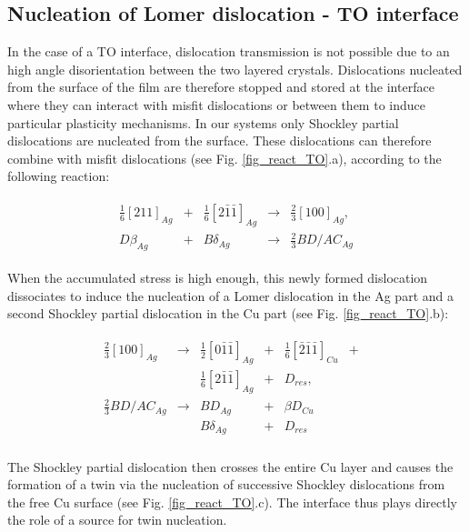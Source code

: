 \documentclass[final,3p,times,twocolumn]{elsarticle}
\begin{document}
	\subsection{Nucleation of Lomer dislocation - TO interface}
	\label{subsubpart_lomer}
	
In the case of a TO interface, dislocation transmission is not possible due to an high angle disorientation between the two layered crystals. Dislocations nucleated from the surface of the film are therefore stopped and stored at the interface where they can interact with misfit dislocations or between them to induce particular plasticity mechanisms. In our systems only Shockley partial dislocations are nucleated from the surface. These dislocations can therefore combine with misfit dislocations (see Fig. \ref{fig_react_TO}.a), according to the following reaction:

\begin{eqnarray}\label{2}
	\begin{array}{ccccccccccccc}
\frac{1}{6}\left[211\right]_{Ag} &+& \frac{1}{6}\left[2\bar{1}\bar{1}\right]_{Ag} &\rightarrow& \frac{2}{3}\left[100\right]_{Ag},\\
D\beta_{Ag} &+& B\delta_{Ag} &\rightarrow& \frac{2}{3}BD/AC_{Ag} 
	\end{array}
\end{eqnarray}

When the accumulated stress is high enough, this newly formed dislocation dissociates to induce the nucleation of a Lomer dislocation in the Ag part and a second Shockley partial dislocation in the Cu part (see Fig. \ref{fig_react_TO}.b):

\begin{eqnarray}\label{3}
	\begin{array}{ccccccccccccc}
\frac{2}{3}\left[100\right]_{Ag} &\rightarrow& \frac{1}{2}\left[0\bar{1}\bar{1}\right]_{Ag} &+& \frac{1}{6}\left[\bar{2}\bar{1}\bar{1}\right]_{Cu}  &+&\\
 & & \frac{1}{6}\left[2\bar{1}\bar{1}\right]_{Ag} &+& D_{res},\\
\frac{2}{3}BD/AC_{Ag} &\rightarrow& BD_{Ag} &+& \beta D_{Cu} \\
 & & B\delta_{Ag} &+& D_{res}
	\end{array}
\end{eqnarray} \\

The Shockley partial dislocation then crosses the entire Cu layer and causes the formation of a twin via the nucleation of successive Shockley dislocations from the free Cu surface (see Fig. \ref{fig_react_TO}.c). The interface thus plays directly the role of a source for twin nucleation. 
\end{document}
